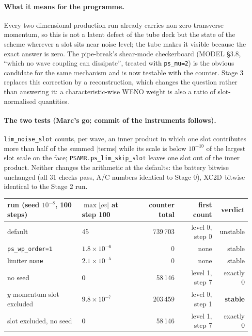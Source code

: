 \documentclass[11pt,a4paper]{article}
\newcommand{\code}[1]{\texttt{\small #1}}
\begin{document}
\paragraph{What it means for the programme.}  Every two-dimensional
production run already carries non-zero transverse momentum, so this is
not a latent defect of the tube deck but the state of the scheme wherever
a slot sits near noise level; the tube makes it visible because the exact
answer is zero.  The pipe-break's shear-mode checkerboard (MODEL \S3.8,
``which no wave coupling can dissipate'', treated with \code{ps\_mu=2}) is
the obvious candidate for the same mechanism and is now testable with the
counter.  Stage 3 replaces this correction by a reconstruction, which
changes the question rather than answering it: a characteristic-wise
WENO weight is also a ratio of slot-normalised quantities.

\paragraph{The two tests (Marc's go; commit of the instruments
follows).}  \code{lim\_noise\_slot} counts, per wave, an inner product in
which one slot contributes more than half of the summed $|$terms$|$ while
its scale is below $10^{-10}$ of the largest slot scale on the face;
\code{PSAMR.ps\_lim\_skip\_slot} leaves one slot out of the inner product.
Neither changes the arithmetic at the defaults: the battery bitwise
unchanged (all 31 checks pass, A/C numbers identical to Stage 0), XC2D
bitwise identical to the Stage 2 run.

\begin{center}
\small
\begin{tabular}{llrrr}
\toprule
run (seed $10^{-8}$, 100 steps) & $\max|\rho v|$ at step 100 & counter total & first count & verdict \\
\midrule
default & 45 & 739\,703 & level 0, step 0 & unstable \\
\code{ps\_wp\_order=1} & $1.8\times10^{-6}$ & 0 & none & stable \\
limiter \code{none} & $2.1\times10^{-5}$ & 0 & none & stable \\
no seed & 0 & 58\,146 & level 1, step 7 & exactly 0 \\
$y$-momentum slot excluded & $9.8\times10^{-7}$ & 203\,459 & level 0, step 1 & \textbf{stable} \\
slot excluded, no seed & 0 & 58\,146 & level 1, step 7 & exactly 0 \\
\bottomrule
\end{tabular}
\end{center}
\end{document}
